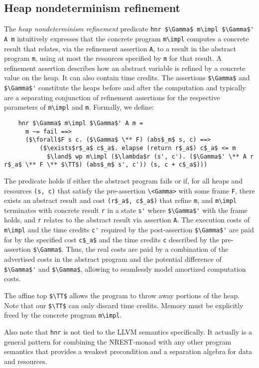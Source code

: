 \documentclass[acmsmall]{acmart}
\newcommand{\is}{\lstinline[language=isabelle]}
\begin{document}
\subsection{Heap nondeterminism refinement}
The \emph{heap nondeterminism refinement} predicate \is{hnr $\Gamma$ m\impl $\Gamma$' A m} intuitively expresses that the concrete program \is{m\impl} computes a concrete result that relates, via the refinement assertion \is{A}, to a result in the abstract program \is{m}, using at most the resources specified by \is{m} for that result.
A refinement assertion describes how an abstract variable is refined by a concrete value on the heap. It can also contain time credits.
The assertions \is{$\Gamma$} and \is{$\Gamma$'} constitute the heaps before and after the computation and typically are a separating conjunction of refinement assertions for the respective parameters of \is{m\impl} and \is{m}. Formally, we define:
\begin{lstlisting}
    hnr $\Gamma$ m\impl $\Gamma$' A m = 
      m ~= fail ==>
      ($\forall$F s c. ($\Gamma$ \** F) (abs$_m$ s, c) ==> 
          ($\exists$r$_a$ c$_a$. elapse (return r$_a$) c$_a$ <= m
            $\land$ wp m\impl ($\lambda$r (s', c'). ($\Gamma$' \** A r r$_a$ \** F \** $\TT$) (abs$_m$ s', c')) (s, c + c$_a$)))
\end{lstlisting}
The predicate holds if either the abstract program fails or if, for all heaps and resources \is{(s, c)} that satisfy the pre-assertion \is{\<Gamma>} with some frame \is{F}, there exists an abstract result and cost \is{(r$_a$, c$_a$)} that refine \is{m}, and \is{m\impl} terminates with concrete result \is{r} in a state \is$s'$ where \is{$\Gamma$'} with the frame holds, and \is{r} relates to the abstract result via assertion \is{A}.
The execution costs of \is{m\impl} and the time credits \is{c'} required by the post-assertion \is{$\Gamma$'} are paid for by the specified cost \is{c$_a$} and the time credits \is{c} described by the pre-assertion \is{$\Gamma$}.
Thus, the real costs are paid by a combination of the advertised costs in the abstract program and the potential difference of \is{$\Gamma$'} and \is{$\Gamma$}, allowing to seamlessly model amortized computation costs.

The affine top \is{$\TT$} allows the program to throw away portions of the heap.
Note that our \is{$\TT$} can only discard time credits.
Memory must be explicitly freed by the concrete program \is{m\impl}.

Also note that \is{hnr} is not tied to the LLVM semantics specifically.
It actually is a general pattern for combining the NREST-monad with any other program semantics that provides a weakest precondition and a separation algebra for data and resources.
\end{document}
